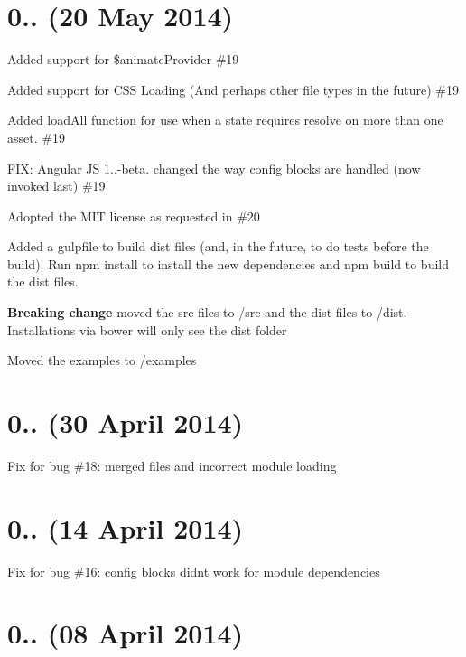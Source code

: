 \section*{0.. (20 May 2014)}


\begin{DoxyItemize}
\item Added support for \$animate\+Provider \#19
\item Added support for C\+SS Loading (And perhaps other file types in the future) \#19
\item Added load\+All function for use when a state requires resolve on more than one asset. \#19
\item F\+IX\+: Angular JS 1..-\/beta. changed the way config blocks are handled (now invoked last) \#19
\item Adopted the M\+IT license as requested in \#20
\item Added a gulpfile to build dist files (and, in the future, to do tests before the build). Run {\ttfamily npm install} to install the new dependencies and {\ttfamily npm build} to build the dist files.
\item {\bfseries Breaking change} moved the src files to /src and the dist files to /dist. Installations via bower will only see the dist folder
\item Moved the examples to /examples
\end{DoxyItemize}

\section*{0.. (30 April 2014)}


\begin{DoxyItemize}
\item Fix for bug \#18\+: merged files and incorrect module loading
\end{DoxyItemize}

\section*{0.. (14 April 2014)}


\begin{DoxyItemize}
\item Fix for bug \#16\+: config blocks didn\textquotesingle{}t work for module dependencies
\end{DoxyItemize}

\section*{0.. (08 April 2014)}


